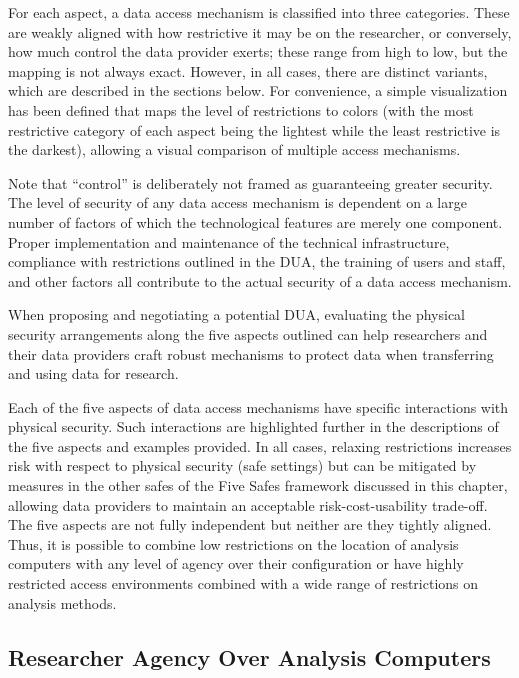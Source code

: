 For each aspect, a data access mechanism is classified into three categories. These are weakly aligned with how restrictive it may be on the researcher, or conversely, how much control the data provider exerts; these range from high to low, but the mapping is not always exact. However, in all cases, there are distinct variants, which are described in the sections below. For convenience, a simple visualization has been defined that maps the level of restrictions to colors (with the most restrictive category of each aspect being the lightest while the least restrictive is the darkest), allowing a visual comparison of multiple access mechanisms.

Note that ``control'' is deliberately not framed as guaranteeing greater security. The level of security of any data access mechanism is dependent on a large number of factors of which the technological features are merely one component. Proper implementation and maintenance of the technical infrastructure, compliance with restrictions outlined in the DUA, the training of users and staff, and other factors all contribute to the actual security of a data access mechanism.

When proposing and negotiating a potential DUA, evaluating the physical security arrangements along the five aspects outlined can help researchers and their data providers craft robust mechanisms to protect data when transferring and using data for research.

Each of the five aspects of data access mechanisms have specific interactions with physical security. Such interactions are highlighted further in the descriptions of the five aspects and examples provided. In all cases, relaxing restrictions increases risk with respect to physical security (safe settings) but can be mitigated by measures in the other safes of the Five Safes framework discussed in this chapter, allowing data providers to maintain an acceptable risk-cost-usability trade-off. The five aspects are not fully independent but neither are they tightly aligned. Thus, it is possible to combine low restrictions on the location of analysis computers with any level of agency over their configuration or have highly restricted access environments combined with a wide range of restrictions on analysis methods.

\hypertarget{researcher-agency-over-analysis-computers}{%
\subsection{Researcher Agency Over Analysis Computers}\label{researcher-agency-over-analysis-computers}}

